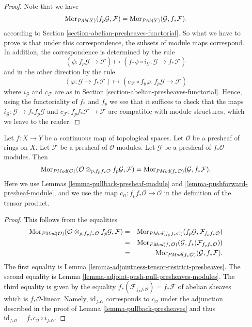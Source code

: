 \begin{proof}
Note that we have
$$
\mathop{\mathrm{Mor}}\nolimits_{\textit{PAb}(X)}(f_p\mathcal{G}, \mathcal{F})
=
\mathop{\mathrm{Mor}}\nolimits_{\textit{PAb}(Y)}(\mathcal{G}, f_*\mathcal{F}).
$$
according to Section \ref{section-abelian-presheaves-functorial}.
So what we have to prove is that under this correspondence, the
subsets of module maps correspond. In addition, the correspondence
is determined by the rule
$$
(\psi : f_p\mathcal{G} \to \mathcal{F})
\longmapsto
(f_*\psi \circ i_\mathcal{G} :
\mathcal{G} \to f_* \mathcal{F})
$$
and in the other direction by the rule
$$
(\varphi : \mathcal{G} \to f_* \mathcal{F})
\longmapsto
(c_\mathcal{F} \circ f_p\varphi : f_p\mathcal{G} \to \mathcal{F})
$$
where $i_\mathcal{G}$ and $c_\mathcal{F}$ are as in
Section \ref{section-abelian-presheaves-functorial}.
Hence, using the functoriality of $f_*$ and $f_p$ we see that
it suffices to check that the maps
$i_\mathcal{G} : \mathcal{G} \to f_* f_p \mathcal{G}$ and
$c_\mathcal{F} : f_p f_* \mathcal{F} \to \mathcal{F}$
are compatible with module structures, which we leave to the reader.
\end{proof}

\begin{lemma}
\label{lemma-adjoint-pull-push-presheaves-modules}
Let $f : X \to Y$ be a continuous map of topological spaces.
Let $\mathcal{O}$ be a presheaf of rings on $X$.
Let $\mathcal{F}$ be a presheaf of $\mathcal{O}$-modules.
Let $\mathcal{G}$ be a presheaf of $f_*\mathcal{O}$-modules.
Then
$$
\mathop{\mathrm{Mor}}\nolimits_{\textit{PMod}(\mathcal{O})}(
\mathcal{O} \otimes_{p, f_pf_*\mathcal{O}} f_p\mathcal{G}, \mathcal{F})
=
\mathop{\mathrm{Mor}}\nolimits_{\textit{PMod}(f_*\mathcal{O})}(\mathcal{G}, f_*\mathcal{F}).
$$
Here we use
Lemmas \ref{lemma-pullback-presheaf-module}
and \ref{lemma-pushforward-presheaf-module}, and we use
the map $c_\mathcal{O} : f_pf_*\mathcal{O} \to \mathcal{O}$
in the definition of the tensor product.
\end{lemma}

\begin{proof}
This follows from the equalities
\begin{eqnarray*}
\mathop{\mathrm{Mor}}\nolimits_{\textit{PMod}(\mathcal{O})}(
\mathcal{O} \otimes_{p, f_pf_*\mathcal{O}} f_p\mathcal{G}, \mathcal{F})
& = &
\mathop{\mathrm{Mor}}\nolimits_{\textit{PMod}(f_pf_*\mathcal{O})}(
f_p\mathcal{G}, \mathcal{F}_{f_pf_*\mathcal{O}}) \\
& = &
\mathop{\mathrm{Mor}}\nolimits_{\textit{PMod}(f_*\mathcal{O})}(\mathcal{G},
f_*(\mathcal{F}_{f_pf_*\mathcal{O}})) \\
& = &
\mathop{\mathrm{Mor}}\nolimits_{\textit{PMod}(f_*\mathcal{O})}(\mathcal{G}, f_*\mathcal{F}).
\end{eqnarray*}
The first equality is
Lemma \ref{lemma-adjointness-tensor-restrict-presheaves}.
The second equality is
Lemma \ref{lemma-adjoint-push-pull-presheaves-modules}.
The third equality is given by the equality
$f_*(\mathcal{F}_{f_pf_*\mathcal{O}}) = f_*\mathcal{F}$
of abelian sheaves which is $f_*\mathcal{O}$-linear. Namely,
$\text{id}_{f_*\mathcal{O}}$ corresponds to $c_\mathcal{O}$
under the adjunction described in the proof of
Lemma \ref{lemma-pullback-presheaves}
and thus
$\text{id}_{f_*\mathcal{O}} = f_*c_\mathcal{O} \circ i_{f_*\mathcal{O}}$.
\end{proof}

